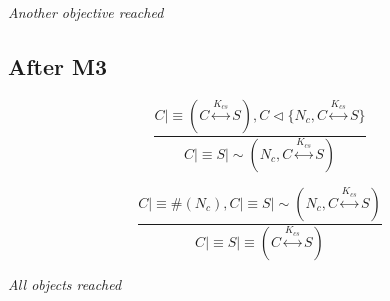 \emph{Another objective reached}


\subsection{After M3}

\begin{equation}
\frac{
	C \mid\equiv ( C \stackrel {K_{cs}}\longleftrightarrow S ), C \triangleleft \{ N_{c}, C \stackrel {K_{cs}}\longleftrightarrow S \} 
}
{
	C \mid\equiv S \mid\sim ( N_{c}, C \stackrel {K_{cs}}\longleftrightarrow S )  
}
\end{equation}

\begin{equation}
\frac{
	C \mid\equiv \#(N_{c}), C \mid\equiv S  \mid\sim ( N_{c}, C \stackrel {K_{cs}}\longleftrightarrow S )
}
{
	C \mid\equiv S \mid\equiv ( C \stackrel {K_{cs}}\longleftrightarrow S )
}
\end{equation}

\emph{All objects reached}
